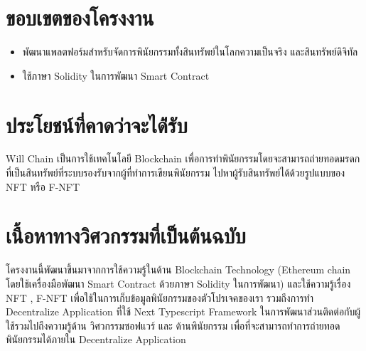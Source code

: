 \documentclass[12pt,oneside,openright,a4paper]{cpe-thai-project}
\begin{document}
\section{ขอบเขตของโครงงาน}

\begin{itemize}
\item พัฒนาแพลตฟอร์มสำหรับจัดการพินัยกรรมทั้งสินทรัพย์ในโลกความเป็นจริง และสินทรัพย์ดิจิทัล
\item ใช้ภาษา Solidity ในการพัฒนา Smart Contract
\end{itemize}

\section{ประโยชน์ที่คาดว่าจะได้่รับ}
\tab Will Chain เป็นการใช้เทคโนโลยี Blockchain เพื่อการทำพินัยกรรมโดยจะสามารถถ่ายทอดมรดกที่เป็นสินทรัพย์ที่ระบบรองรับจากผู้ที่ทำการเขียนพินัยกรรม ไปหาผู้รับสินทรัพย์ได้ด้วยรูปแบบของ NFT หรือ F-NFT
\section{เนื้อหาทางวิศวกรรมที่เป็นต้นฉบับ}
\tab โครงงานนี้พัฒนาขึ้นมาจากการใช้ความรู้ในด้าน Blockchain Technology (Ethereum chain โดยใช้เครื่องมือพัฒนา Smart Contract ด้วยภาษา Solidity ในการพัฒนา)  และใช้ความรู้เรื่อง NFT , F-NFT เพื่อใช้ในการเก็บข้อมูลพินัยกรรมของตัวโปรเจคของเรา รวมถึงการทำ Decentralize  Application ที่ใช้ Next Typescript Framework ในการพัฒนาส่วนติดต่อกับผู้ใช้รวมไปถึงความรู้ด้าน วิศวกรรมซอฟแวร์ และ ด้านพินัยกรรม เพื่อที่จะสามารถทำการถ่ายทอดพินัยกรรมได้ภายใน Decentralize  Application
\end{document}

